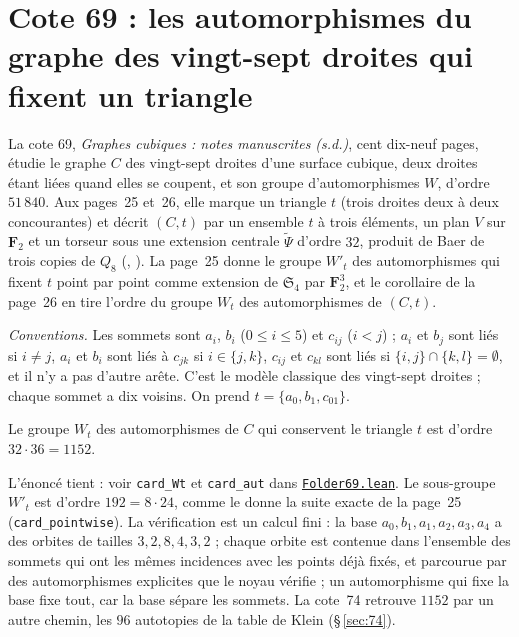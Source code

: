 \section[Cote 69 : les automorphismes du graphe des vingt-sept droites qui fixent un triangle]{Cote 69 : les automorphismes du graphe des vingt-sept droites qui fixent un triangle\protect{}}\label{sec:69}

La cote 69, \emph{Graphes cubiques : notes manuscrites (s.d.)}, cent dix-neuf pages, étudie le graphe $C$ des vingt-sept droites d'une surface cubique, deux droites étant liées quand elles se coupent, et son groupe d'automorphismes $W$, d'ordre $51\,840$. Aux pages~25 et~26, elle marque un triangle $t$ (trois droites deux à deux concourantes) et décrit $(C, t)$ par un ensemble $t$ à trois éléments, un plan $V$ sur $\mathbf F_2$ et un torseur sous une extension centrale $\widetilde\Psi$ d'ordre $32$, produit de Baer de trois copies de $Q_8$ (, ). La page~25 donne le groupe $W'_t$ des automorphismes qui fixent $t$ point par point comme extension de $\mathfrak S_4$ par $\mathbf F_2^3$, et le corollaire de la page~26 en tire l'ordre du groupe $W_t$ des automorphismes de $(C, t)$.

\noindent\emph{Conventions.} Les sommets sont $a_i$, $b_i$ ($0 \leq i \leq 5$) et $c_{ij}$ ($i < j$) ; $a_i$ et $b_j$ sont liés si $i \neq j$, $a_i$ et $b_i$ sont liés à $c_{jk}$ si $i \in \{j, k\}$, $c_{ij}$ et $c_{kl}$ sont liés si $\{i, j\} \cap \{k, l\} = \emptyset$, et il n'y a pas d'autre arête. C'est le modèle classique des vingt-sept droites ; chaque sommet a dix voisins. On prend $t = \{a_0, b_1, c_{01}\}$.

\begin{encadre}
\begin{theoreme}
Le groupe $W_t$ des automorphismes de $C$ qui conservent le triangle $t$ est d'ordre $32 \cdot 36 = 1152$.
\end{theoreme}
\end{encadre}

\noindent L'énoncé tient : voir \texttt{card\_Wt} et \texttt{card\_aut} dans \href{\leanblob/Geometry/Folder69.lean}{\texttt{Folder69.\allowbreak{}lean}}. Le sous-groupe $W'_t$ est d'ordre $192 = 8 \cdot 24$, comme le donne la suite exacte de la page~25 (\texttt{card\_pointwise}). La vérification est un calcul fini : la base $a_0, b_1, a_1, a_2, a_3, a_4$ a des orbites de tailles $3, 2, 8, 4, 3, 2$ ; chaque orbite est contenue dans l'ensemble des sommets qui ont les mêmes incidences avec les points déjà fixés, et parcourue par des automorphismes explicites que le noyau vérifie ; un automorphisme qui fixe la base fixe tout, car la base sépare les sommets. La cote~74 retrouve $1152$ par un autre chemin, les $96$ autotopies de la table de Klein (§\,\ref{sec:74}).

